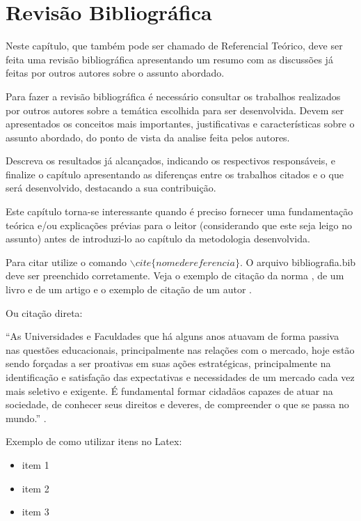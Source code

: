 \chapter{Revisão Bibliográfica} \label{RevisaoBibliografica}

Neste capítulo, que também pode ser chamado de Referencial Teórico, deve ser feita uma revisão bibliográfica apresentando um resumo com as discussões já feitas por outros autores sobre o assunto abordado.

Para fazer a revisão bibliográfica é necessário consultar os trabalhos  realizados por outros autores sobre a temática escolhida para ser desenvolvida. Devem ser apresentados os conceitos mais importantes, justificativas e características sobre o assunto abordado, do ponto de vista da analise feita pelos autores. 

Descreva os resultados já alcançados, indicando os respectivos responsáveis, e finalize o capítulo apresentando as diferenças entre os trabalhos citados e o que será desenvolvido, destacando a sua contribuição.

Este capítulo torna-se interessante quando é preciso fornecer uma fundamentação teórica e/ou explicações prévias para o leitor (considerando que este seja leigo no assunto) antes de introduzi-lo ao capítulo da metodologia desenvolvida.

Para citar utilize o comando $\backslash cite\{nomedereferencia\} $. O arquivo bibliografia.bib deve ser preenchido corretamente. Veja o exemplo de citação da norma \cite{NBR10520}, de um livro \cite{ogata} e de um artigo \cite{sbse} e o exemplo de citação de um autor .

Ou citação direta:

\begin{flushright}
\noindent
\parbox{\linewidth-4cm}{
“As Universidades e Faculdades que há alguns anos atuavam de forma passiva nas questões educacionais, principalmente nas relações com o mercado, hoje estão sendo forçadas a ser proativas em suas ações estratégicas, principalmente na identificação e satisfação das expectativas e necessidades de um mercado cada vez mais seletivo e exigente. É fundamental formar cidadãos capazes de atuar na sociedade, de conhecer seus direitos e deveres, de compreender o que se passa no mundo.”  \cite{neves2002}.
}
\end{flushright}

Exemplo de como utilizar itens no Latex:

\begin{itemize}\itemsep5pt
    \item item 1
    \item item 2
    \item item 3
\end{itemize}








